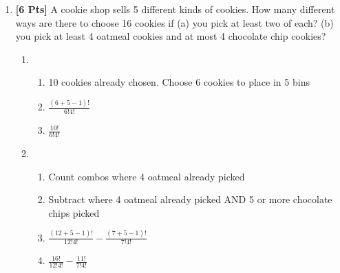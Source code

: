 \documentclass[11pt]{article}
\begin{document}
\begin{enumerate}
        \item {\bf [6 Pts]} A cookie shop sells 5 different kinds of cookies. How many different ways are there to choose 16 cookies if (a) you pick at least two of each? (b) you pick at least 4 oatmeal cookies and at most 4 chocolate chip cookies?
        \begin{enumerate}
            \item
            \begin{enumerate}
                \item 10 cookies already chosen. Choose 6 cookies to place in 5 bins
                \item $\frac{(6 + 5 - 1)!}{6!4!}$
                \item $\frac{10!}{6!4!}$
            \end{enumerate}
            \item
            \begin{enumerate}
                \item Count combos where 4 oatmeal already picked
                \item Subtract where 4 oatmeal already picked AND 5 or more chocolate chips picked
                \item $\frac{(12 + 5 - 1)!}{12!4!} - \frac{(7 + 5 - 1)!}{7!4!}$
                \item $\frac{16!}{12!4!} - \frac{11!}{7!4!}$
            \end{enumerate}
        \end{enumerate}


\end{enumerate}
\end{document}
